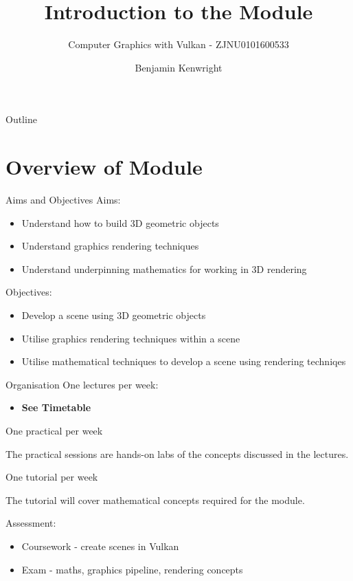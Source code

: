 \documentclass[handout,18pt]{beamer}
\author{Benjamin Kenwright}
\title[Introduction to Module]{Introduction to the Module}
\subtitle[Computer Graphics with Vulkan]{Computer Graphics with Vulkan - ZJNU0101600533}
\institute{Zhejiang Normal University}
\date{}
\begin{document}
\begin{frame} %
    \titlepage
\end{frame}
    
\begin{frame}{Outline}
    \tableofcontents[pausesections]
\end{frame}
    
\section{Overview of Module}
    
\begin{frame}{Aims and Objectives}
    \pause
    Aims:
    \begin{itemize}
        \item Understand how to build 3D geometric objects
        \item Understand graphics rendering techniques
        \item Understand underpinning mathematics for working in 3D rendering
    \end{itemize}
    \vspace{11pt}
    \pause
    
    Objectives:
    \begin{itemize}
        \item Develop a scene using 3D geometric objects
        \item Utilise graphics rendering techniques within a scene
        \item Utilise mathematical techniques to develop a scene using rendering techniqes
    \end{itemize}
\end{frame}

\begin{frame}{Organisation}
\pause
One lectures per week:
\begin{itemize}
\item \textbf{See Timetable}
\end{itemize}
\pause

One practical per week

The practical sessions are hands-on labs of the concepts discussed in the lectures.

\pause
One tutorial per week

The tutorial will cover mathematical concepts required for the module.

Assessment:
\begin{itemize}
\item Coursework - create scenes in Vulkan
\item Exam - maths, graphics pipeline, rendering concepts
\end{itemize}
\end{frame}
\end{document}
